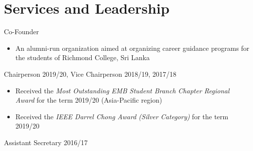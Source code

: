 \documentclass[10pt,a4paper,sans]{moderncv} %
\begin{document}
\section{Services and Leadership}
{Co-Founder}{}{}{
  \begin{itemize}
    \item An alumni-run organization aimed at organizing career guidance programs for the students of Richmond College, Sri Lanka
  \end{itemize}
}

{Chairperson 2019/20, Vice Chairperson 2018/19, 2017/18}{}{}{
  \begin{itemize}
    \item Received the \textit{Most Outstanding EMB Student Branch Chapter Regional Award} for the term 2019/20 (Asia-Pacific region)
    \item Received the \textit{IEEE Darrel Chong Award (Silver Category)} for the term 2019/20
  \end{itemize}
}

{Assistant Secretary 2016/17}{}{}{}







\end{document}
